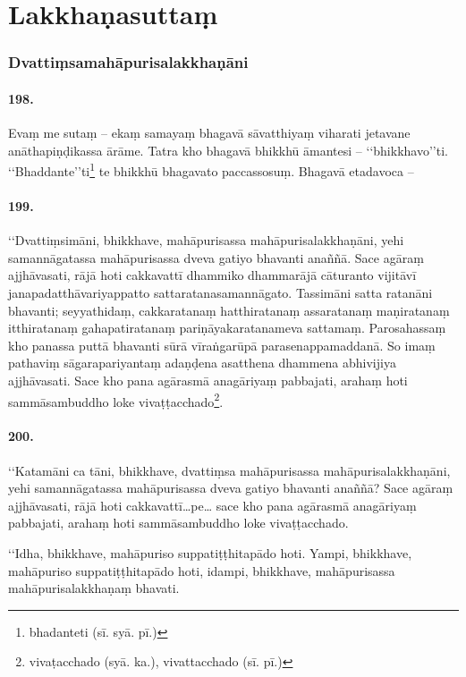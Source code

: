 \section{Lakkhaṇasuttaṃ}

\subsubsection{Dvattiṃsamahāpurisalakkhaṇāni}

\paragraph{198.} Evaṃ me sutaṃ – ekaṃ samayaṃ bhagavā sāvatthiyaṃ viharati jetavane anāthapiṇḍikassa ārāme. Tatra kho bhagavā bhikkhū āmantesi – ‘‘bhikkhavo’’ti. ‘‘Bhaddante’’ti\footnote{bhadanteti (sī. syā. pī.)} te bhikkhū bhagavato paccassosuṃ. Bhagavā etadavoca –

\paragraph{199.} ‘‘Dvattiṃsimāni, bhikkhave, mahāpurisassa mahāpurisalakkhaṇāni, yehi samannāgatassa mahāpurisassa dveva gatiyo bhavanti anaññā. Sace agāraṃ ajjhāvasati, rājā hoti cakkavattī dhammiko dhammarājā cāturanto vijitāvī janapadatthāvariyappatto sattaratanasamannāgato. Tassimāni satta ratanāni bhavanti; seyyathidaṃ, cakkaratanaṃ hatthiratanaṃ assaratanaṃ maṇiratanaṃ itthiratanaṃ gahapatiratanaṃ pariṇāyakaratanameva sattamaṃ. Parosahassaṃ kho panassa puttā bhavanti sūrā vīraṅgarūpā parasenappamaddanā. So imaṃ pathaviṃ sāgarapariyantaṃ adaṇḍena asatthena dhammena abhivijiya ajjhāvasati. Sace kho pana agārasmā anagāriyaṃ pabbajati, arahaṃ hoti sammāsambuddho loke vivaṭṭacchado\footnote{vivaṭacchado (syā. ka.), vivattacchado (sī. pī.)}.

\paragraph{200.} ‘‘Katamāni ca tāni, bhikkhave, dvattiṃsa mahāpurisassa mahāpurisalakkhaṇāni, yehi samannāgatassa mahāpurisassa dveva gatiyo bhavanti anaññā? Sace agāraṃ ajjhāvasati, rājā hoti cakkavattī…pe… sace kho pana agārasmā anagāriyaṃ pabbajati, arahaṃ hoti sammāsambuddho loke vivaṭṭacchado.

‘‘Idha, bhikkhave, mahāpuriso suppatiṭṭhitapādo hoti. Yampi, bhikkhave, mahāpuriso suppatiṭṭhitapādo hoti, idampi, bhikkhave, mahāpurisassa mahāpurisalakkhaṇaṃ bhavati.

